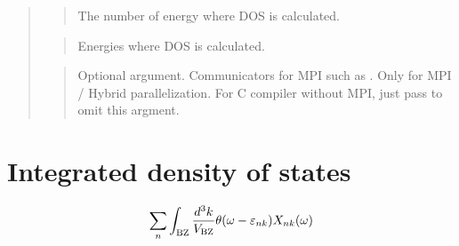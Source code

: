 \documentclass[letterpaper,10pt,pdftex,openany,english]{sphinxmanual}
\begin{document}
\begin{quote}
\begin{quote}
\sphinxAtStartPar
The number of energy where DOS is calculated.
\end{quote}

\begin{sphinxVerbatim}[commandchars=\\\{\}]
\end{sphinxVerbatim}
\begin{quote}

\sphinxAtStartPar
Energies where DOS is calculated.
\end{quote}

\begin{sphinxVerbatim}[commandchars=\\\{\}]
\end{sphinxVerbatim}
\begin{quote}

\sphinxAtStartPar
Optional argument. Communicators for MPI such as .
Only for MPI / Hybrid parallelization.
For C compiler without MPI, just pass  to omit this argment.
\end{quote}
\end{quote}


\section{Integrated density of states}
\label{\detokenize{routine:integrated-density-of-states}}\begin{equation*}
\begin{split}\begin{align}
\sum_{n}
\int_{\rm BZ} \frac{d^3 k}{V_{\rm BZ}}
\theta(\omega - \varepsilon_{n k})
X_{n k}(\omega)
\end{align}\end{split}
\end{equation*}
\begin{sphinxVerbatim}[commandchars=\\\{\}]
\end{sphinxVerbatim}
\end{document}
